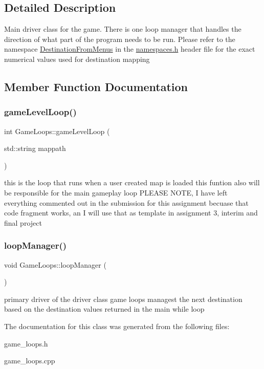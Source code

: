 \subsection{Detailed Description}
Main driver class for the game. There is one loop manager that handles the direction of what part of the program needs to be run. Please refer to the namespace \hyperlink{namespace_destination_from_menus}{Destination\+From\+Menus} in the \hyperlink{namespaces_8h}{namespaces.\+h} header file for the exact numerical values used for destination mapping 

\subsection{Member Function Documentation}
\hypertarget{class_game_loops_aeeda849e01acbbd017f46a4d9f69a9d7}{}\label{class_game_loops_aeeda849e01acbbd017f46a4d9f69a9d7} 
\subsubsection{\texorpdfstring{game\+Level\+Loop()}{gameLevelLoop()}}
{\footnotesize\ttfamily int Game\+Loops\+::game\+Level\+Loop (\begin{DoxyParamCaption}\item[{std\+::string}]{mappath }\end{DoxyParamCaption})}

this is the loop that runs when a user created map is loaded this funtion also will be responsible for the main gameplay loop P\+L\+E\+A\+SE N\+O\+TE, I have left everything commented out in the submission for this assignment becuase that code fragment works, an I will use that as template in assignment 3, interim and final project \hypertarget{class_game_loops_a8aa13702c60f9e77a7dea9f698556ec0}{}\label{class_game_loops_a8aa13702c60f9e77a7dea9f698556ec0} 
\subsubsection{\texorpdfstring{loop\+Manager()}{loopManager()}}
{\footnotesize\ttfamily void Game\+Loops\+::loop\+Manager (\begin{DoxyParamCaption}{ }\end{DoxyParamCaption})}

primary driver of the driver class game loops managest the next destination based on the destination values returned in the main while loop 

The documentation for this class was generated from the following files\+:\begin{DoxyCompactItemize}
\item 
game\+\_\+loops.\+h\item 
game\+\_\+loops.\+cpp\end{DoxyCompactItemize}
